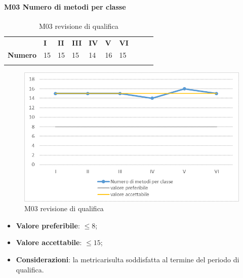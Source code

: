 \paragraph{M03 Numero di metodi per classe} \mbox{}
\begin{longtable}[H!] {						
		>{}p{50mm}  		
		>{}p{8mm}
		>{}p{8mm}		
		>{}p{8mm}		
		>{}p{8mm}		
		>{}p{8mm}		
		>{}p{8mm}
		>{}p{8mm}
		>{}p{8mm}
		>{}p{8mm}
	}
	\rowcolor{gray!50}
	\textbf{} & \textbf{I} & \textbf{II} & \textbf{III} & \textbf{IV} & \textbf{V} & \textbf{VI} \TBstrut \\ [2mm]
	\textbf{Numero} & 15 & 15 & 15 & 14 & 16 & 15 \TBstrut \\ [2mm]
	\rowcolor{white}
	\caption{M03 revisione di qualifica}
\end{longtable}
\begin{figure}[H] 	
	\includegraphics[width=\linewidth]{./img/grafici/RQ3.png}	
	\caption{M03 revisione di qualifica}	
\end{figure}
\begin{itemize}
	\item \textbf{Valore preferibile}: $\le 8$;
	\item \textbf{Valore accettabile}: $\le 15$;
	\item \textbf{Considerazioni}: la metrica\glosp risulta soddisfatta al termine del periodo di qualifica.
\end{itemize}


